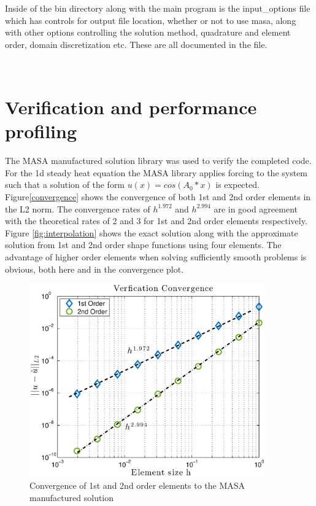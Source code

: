 \documentclass[12pt]{article}
\begin{document}
Inside of the bin directory along with the main program is the input\_options file which has controls for output file location, whether or not to use masa, along with other options controlling the solution method, quadrature and element order, domain discretization etc.  These are all documented in the file.

~\\
\section*{Verification and performance profiling}

The MASA manufactured solution library was used to verify the completed code.  For the 1d steady heat equation the MASA library applies forcing to the system such that a solution of the form $u(x)=cos(A_0*x)$ is expected.  Figure\ref{convergence} shows the convergence of both 1st and 2nd order elements in the L2 norm.  The convergence rates of $h^1.972$ and $h^2.994$ are in good agreement with the theoretical rates of 2 and 3 for 1st and 2nd order elements respectively.  Figure \ref{fig:interpolation} shows the exact solution along with the approximate solution from 1st and 2nd order shape functions using four elements.  The advantage of higher order elements when solving sufficiently smooth problems is obvious, both here and in the convergence plot.

\begin{figure}[!htbp] %
   \centering
   \includegraphics[width=4in]{convergence.eps} 
   \caption{Convergence of 1st and 2nd order elements to the MASA manufactured solution}
   \label{fig:convergence}
\end{figure}
\end{document}

